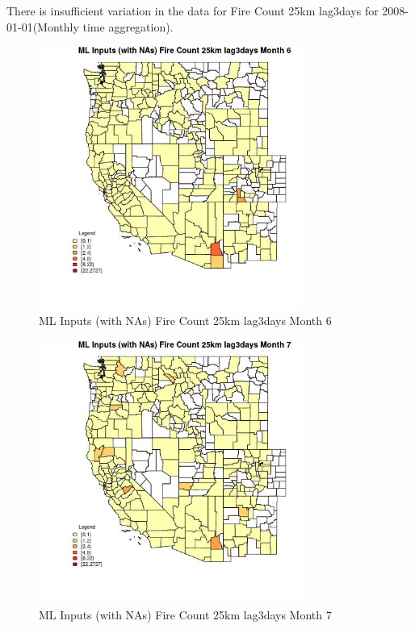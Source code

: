 There is insufficient variation in the data for Fire Count 25km lag3days for 2008-01-01(Monthly time aggregation). 
 

\begin{figure} 
\centering  
\includegraphics[width=0.77\textwidth]{Code_Outputs/Report_ML_input_PM25_Step4_part_f_de_duplicated_aveswNAs_CountyFire_Count_25km_lag3daysmedianMonth6.jpg} 
\caption{\label{fig:Report_ML_input_PM25_Step4_part_f_de_duplicated_aveswNAsCountyFire_Count_25km_lag3daysmedianMonth6}ML Inputs (with NAs) Fire Count 25km lag3days Month 6} 
\end{figure} 
 

\clearpage 

\begin{figure} 
\centering  
\includegraphics[width=0.77\textwidth]{Code_Outputs/Report_ML_input_PM25_Step4_part_f_de_duplicated_aveswNAs_CountyFire_Count_25km_lag3daysmedianMonth7.jpg} 
\caption{\label{fig:Report_ML_input_PM25_Step4_part_f_de_duplicated_aveswNAsCountyFire_Count_25km_lag3daysmedianMonth7}ML Inputs (with NAs) Fire Count 25km lag3days Month 7} 
\end{figure} 
 

